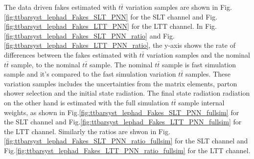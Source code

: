 The data driven fakes estimated with $t\bar{t}$ variation 
samples are shown in Fig.\ref{fig:ttbarsyst_lephad_Fakes_SLT_PNN} 
for the SLT channel and Fig.\ref{fig:ttbarsyst_lephad_Fakes_LTT_PNN} for the LTT channel. 
In Fig.\ref{fig:ttbarsyst_lephad_Fakes_SLT_PNN_ratio} 
and Fig.\ref{fig:ttbarsyst_lephad_Fakes_LTT_PNN_ratio}, the y-axis shows the rate 
of differences between the fakes estimated with $t\bar{t}$ variation samples and 
the nominal $t\bar{t}$ sample, to the nominal $t\bar{t}$ sample. 
The nominal $t\bar{t}$ sample is fast simulation sample and it's compared 
to the fast simulation variation $t\bar{t}$ samples. 
These variation samples includes the uncertainties from the matrix elements, 
parton shower selection and the initial state radiation. 
The final state radiation radiation on the other hand 
is estimated with the full simulation $t\bar{t}$ sample internal weights, 
as shown in Fig.\ref{fig:ttbarsyst_lephad_Fakes_SLT_PNN_fullsim} 
for the SLT channel and Fig.\ref{fig:ttbarsyst_lephad_Fakes_LTT_PNN_fullsim} 
for the LTT channel. Similarly the ratios are 
shwon in Fig.\ref{fig:ttbarsyst_lephad_Fakes_SLT_PNN_ratio_fullsim} 
for the SLT channel and Fig.\ref{fig:ttbarsyst_lephad_Fakes_LTT_PNN_ratio_fullsim} 
for the LTT channel. 







